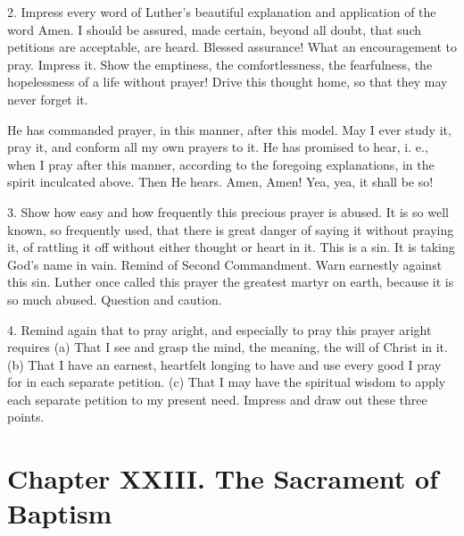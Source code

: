 2. Impress every word of Luther’s beautiful explanation and application of the word Amen.  I should be assured, made certain, beyond all doubt, that such petitions are acceptable, are heard. Blessed assurance! What an encouragement to pray. Impress it. Show the emptiness, the comfortlessness, the fearfulness, the hopelessness of a life without prayer! Drive this thought home, so that they may never forget it.

He has commanded prayer, in this manner, after this model. May I ever study it, pray it, and conform all my own prayers to it. He has promised
to hear, i. e., when I pray after this manner, according to the foregoing explanations, in the spirit inculcated above. Then He hears. Amen, Amen! Yea, yea, it shall be so!

3. Show how easy and how frequently this precious prayer is abused. It is so well known, so frequently used, that there is great danger of saying it without praying it, of rattling it off without either thought or heart in it. This is a sin. It is taking God’s name in vain. Remind of Second Commandment. Warn earnestly against this sin. Luther once called this prayer the greatest martyr on earth, because it is so much abused. Question and caution. 

4. Remind again that to pray aright, and especially to pray this prayer aright requires (a) That I see and grasp the mind, the meaning, the will of Christ in it. (b) That I have an earnest, heartfelt longing to have and use every good I pray for in each separate petition. (c) That I may have the spiritual wisdom to apply each separate petition to my present need. Impress and draw out these three points. 

\chapter{Chapter XXIII. The Sacrament of Baptism}

